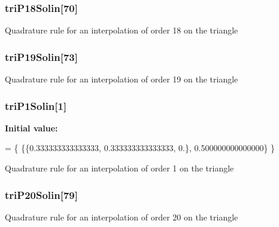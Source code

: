 \subsubsection[{tri\-P18\-Solin}]{ tri\-P18\-Solin[70]}\label{GaussQuadratureTri_8cc_ad10c9c203b705e936c824b3b8d5a5086}
Quadrature rule for an interpolation of order 18 on the triangle 
\subsubsection[{tri\-P19\-Solin}]{ tri\-P19\-Solin[73]}\label{GaussQuadratureTri_8cc_ae9a62bf1edc7b1b58030638a65c50e4d}
Quadrature rule for an interpolation of order 19 on the triangle 
\subsubsection[{tri\-P1\-Solin}]{ tri\-P1\-Solin[1]}\label{GaussQuadratureTri_8cc_ab4c9758a3678b9e50a6ac61b933c84e5}
{\bfseries Initial value\-:}
\begin{DoxyCode}
= \{
  \{\{0.333333333333333, 0.333333333333333, 0.\}, 0.500000000000000\}
\}
\end{DoxyCode}
Quadrature rule for an interpolation of order 1 on the triangle 
\subsubsection[{tri\-P20\-Solin}]{ tri\-P20\-Solin[79]}\label{GaussQuadratureTri_8cc_ae1011cfa5b4956209870fb9e3ad9f712}
Quadrature rule for an interpolation of order 20 on the triangle 
